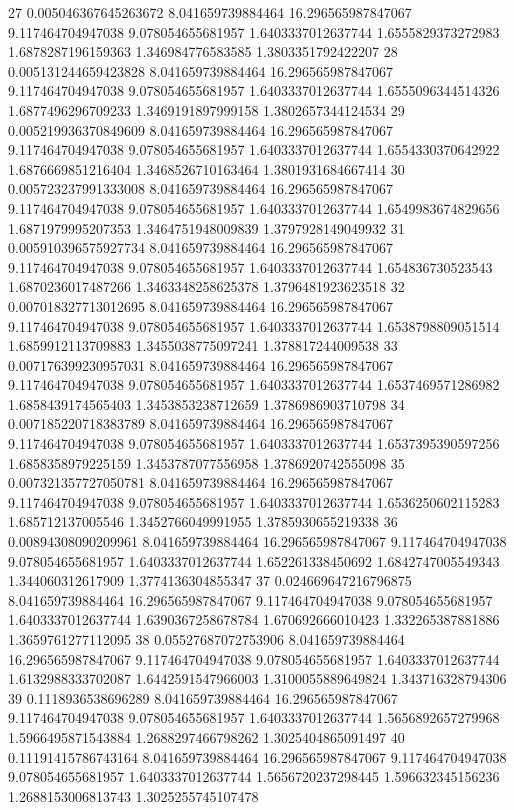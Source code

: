 {27 0.005046367645263672 8.041659739884464 16.296565987847067 9.117464704947038 9.078054655681957 1.6403337012637744 1.6555829373272983 1.6878287196159363 1.346984776583585 1.3803351792422207
28 0.005131244659423828 8.041659739884464 16.296565987847067 9.117464704947038 9.078054655681957 1.6403337012637744 1.6555096344514326 1.6877496296709233 1.3469191897999158 1.3802657344124534
29 0.005219936370849609 8.041659739884464 16.296565987847067 9.117464704947038 9.078054655681957 1.6403337012637744 1.6554330370642922 1.6876669851216404 1.3468526710163464 1.3801931684667414
30 0.005723237991333008 8.041659739884464 16.296565987847067 9.117464704947038 9.078054655681957 1.6403337012637744 1.6549983674829656 1.6871979995207353 1.3464751948009839 1.3797928149049932
31 0.005910396575927734 8.041659739884464 16.296565987847067 9.117464704947038 9.078054655681957 1.6403337012637744 1.654836730523543 1.6870236017487266 1.3463348258625378 1.3796481923623518
32 0.007018327713012695 8.041659739884464 16.296565987847067 9.117464704947038 9.078054655681957 1.6403337012637744 1.6538798809051514 1.6859912113709883 1.3455038775097241 1.378817244009538
33 0.007176399230957031 8.041659739884464 16.296565987847067 9.117464704947038 9.078054655681957 1.6403337012637744 1.6537469571286982 1.6858439174565403 1.3453853238712659 1.3786986903710798
34 0.007185220718383789 8.041659739884464 16.296565987847067 9.117464704947038 9.078054655681957 1.6403337012637744 1.6537395390597256 1.6858358979225159 1.3453787077556958 1.3786920742555098
35 0.007321357727050781 8.041659739884464 16.296565987847067 9.117464704947038 9.078054655681957 1.6403337012637744 1.6536250602115283 1.685712137005546 1.3452766049991955 1.3785930655219338
36 0.00894308090209961 8.041659739884464 16.296565987847067 9.117464704947038 9.078054655681957 1.6403337012637744 1.652261338450692 1.6842747005549343 1.344060312617909 1.3774136304855347
37 0.024669647216796875 8.041659739884464 16.296565987847067 9.117464704947038 9.078054655681957 1.6403337012637744 1.6390367258678784 1.670692666010423 1.332265387881886 1.3659761277112095
38 0.05527687072753906 8.041659739884464 16.296565987847067 9.117464704947038 9.078054655681957 1.6403337012637744 1.6132988333702087 1.6442591547966003 1.3100055889649824 1.343716328794306
39 0.1118936538696289 8.041659739884464 16.296565987847067 9.117464704947038 9.078054655681957 1.6403337012637744 1.5656892657279968 1.5966495871543884 1.2688297466798262 1.3025404865091497
40 0.11191415786743164 8.041659739884464 16.296565987847067 9.117464704947038 9.078054655681957 1.6403337012637744 1.5656720237298445 1.596632345156236 1.2688153006813743 1.3025255745107478
}
